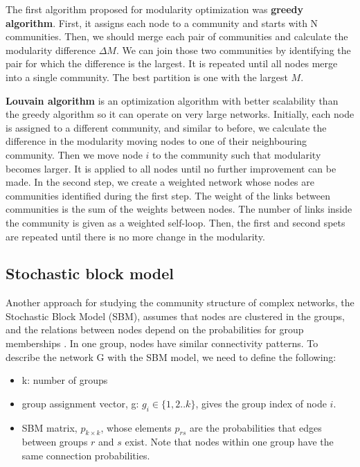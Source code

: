 The first algorithm proposed for modularity optimization was \textbf{greedy algorithm}. First, it assigns each node to a community and starts with N communities. Then, we should merge each pair of communities and calculate the modularity difference $\Delta M$. We can join those two communities by identifying the pair for which the difference is the largest. It is repeated until all nodes merge into a single community. The best partition is one with the largest $M$. 

\textbf{Louvain algorithm} \cite{blondel2008fast} is an optimization algorithm with better scalability than the greedy algorithm so it can operate on very large networks. Initially, each node is assigned to a different community, and similar to before, we calculate the difference in the modularity moving nodes to one of their neighbouring community. Then we move node $i$ to the community such that modularity becomes larger. It is applied to all nodes until no further improvement can be made. In the second step, we create a weighted network whose nodes are communities identified during the first step. The weight of the links between communities is the sum of the weights between nodes. The number of links inside the community is given as a weighted self-loop. Then, the first and second spets are repeated until there is no more change in the modularity. %

\subsection{Stochastic block model}

Another approach for studying the community structure of complex networks, the Stochastic Block Model (SBM), assumes that nodes are clustered in the groups, and the relations between nodes depend on the probabilities for group memberships \cite{lee2019review}. In one group, nodes have similar connectivity patterns. To describe the network G with the SBM model, we need to define the following:

\begin{itemize}
	\item k: number of groups
	\item group assignment vector, g: $g_i \in\{1,2..k\}$, gives the group index of node $i$.
	\item SBM matrix, $p_{k \times k}$, whose elements $p_{rs}$ are the probabilities that edges between groups $r$ and $s$ exist. Note that nodes within one group have the same connection probabilities. 
\end{itemize}

